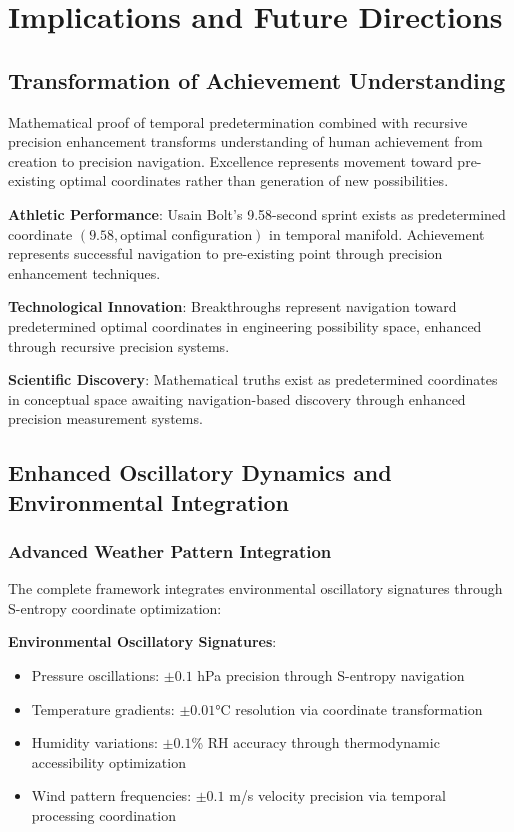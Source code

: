 \documentclass[12pt,a4paper]{article}
\begin{document}
{{{{{{{{{{{{{{\section{Implications and Future Directions}

\subsection{Transformation of Achievement Understanding}

Mathematical proof of temporal predetermination combined with recursive precision enhancement transforms understanding of human achievement from creation to precision navigation. Excellence represents movement toward pre-existing optimal coordinates rather than generation of new possibilities.

\textbf{Athletic Performance}: Usain Bolt's 9.58-second sprint exists as predetermined coordinate $(9.58, \text{optimal configuration})$ in temporal manifold. Achievement represents successful navigation to pre-existing point through precision enhancement techniques.

\textbf{Technological Innovation}: Breakthroughs represent navigation toward predetermined optimal coordinates in engineering possibility space, enhanced through recursive precision systems.

\textbf{Scientific Discovery}: Mathematical truths exist as predetermined coordinates in conceptual space awaiting navigation-based discovery through enhanced precision measurement systems.

\subsection{Enhanced Oscillatory Dynamics and Environmental Integration}

\subsubsection{Advanced Weather Pattern Integration}

The complete framework integrates environmental oscillatory signatures through S-entropy coordinate optimization:

\textbf{Environmental Oscillatory Signatures}:
\begin{itemize}
\item Pressure oscillations: $\pm 0.1$ hPa precision through S-entropy navigation
\item Temperature gradients: $\pm 0.01$°C resolution via coordinate transformation
\item Humidity variations: $\pm 0.1$\% RH accuracy through thermodynamic accessibility optimization
\item Wind pattern frequencies: $\pm 0.1$ m/s velocity precision via temporal processing coordination
\end{itemize}

}}}}}}}}}}}}}}
\end{document}
